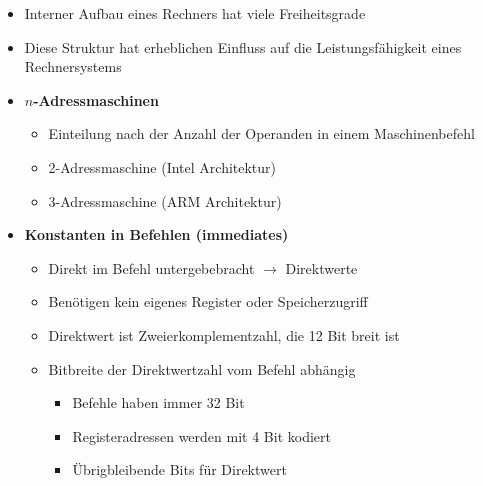 \begin{itemize}
\begin{itemize}
\begin{itemize}
                    \end{itemize}
            \end{itemize}
        \item Interner Aufbau eines Rechners hat viele Freiheitsgrade
        \item Diese Struktur hat erheblichen Einfluss auf die Leistungsfähigkeit eines Rechnersystems 
        \item \textbf{$n$-Adressmaschinen}
            \begin{itemize}
                \item Einteilung nach der Anzahl der Operanden in einem Maschinenbefehl 
                \item 2-Adressmaschine (Intel Architektur)
                \item 3-Adressmaschine (ARM Architektur)
            \end{itemize}
        \item \textbf{Konstanten in Befehlen (immediates)}
            \begin{itemize}
                \item Direkt im Befehl untergebebracht $\rightarrow$ Direktwerte
                \item Benötigen kein eigenes Register oder Speicherzugriff
                \item Direktwert ist Zweierkomplementzahl, die 12 Bit breit ist 
                \item Bitbreite der Direktwertzahl vom Befehl abhängig
                    \begin{itemize}
                        \item Befehle haben immer 32 Bit
                        \item Registeradressen werden mit 4 Bit kodiert
                        \item Übrigbleibende Bits für Direktwert
                    \end{itemize}
            \end{itemize}
    \end{itemize}

